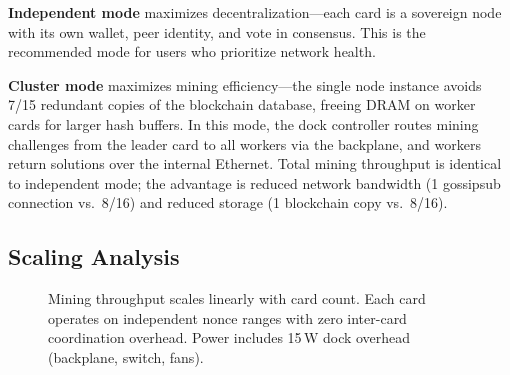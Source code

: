 \documentclass[11pt,a4paper]{article}
\begin{document}
\textbf{Independent mode} maximizes decentralization---each card is a sovereign node with its own wallet, peer identity, and vote in consensus. This is the recommended mode for users who prioritize network health.

\textbf{Cluster mode} maximizes mining efficiency---the single node instance avoids 7/15 redundant copies of the blockchain database, freeing DRAM on worker cards for larger hash buffers. In this mode, the dock controller routes mining challenges from the leader card to all workers via the backplane, and workers return solutions over the internal Ethernet. Total mining throughput is identical to independent mode; the advantage is reduced network bandwidth (1 gossipsub connection vs.\ 8/16) and reduced storage (1 blockchain copy vs.\ 8/16).

\subsection{Scaling Analysis}

\begin{figure}[H]
\centering
{}
\caption{Mining throughput scales linearly with card count. Each card operates on independent nonce ranges with zero inter-card coordination overhead. Power includes 15\,W dock overhead (backplane, switch, fans).}
\label{fig:dock_scaling}
\end{figure}
\end{document}
